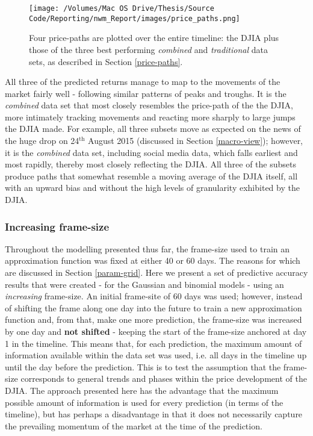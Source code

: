 \documentclass{article}
\begin{document}
\begin{figure}[htb]
\centering
\texttt{[image: /Volumes/Mac OS Drive/Thesis/Source Code/Reporting/nwm\_Report/images/price\_paths.png]}
\caption[Four price-paths, comparing forecasted returns against actual returns]{\label{fig:price-paths}Four price-paths are plotted over the entire timeline: the DJIA plus those of the three best performing \emph{combined} and \emph{traditional} data sets, as described in Section \ref{price-paths}.}
\end{figure}

All three of the predicted returns manage to map to the movements of the market fairly well - following similar patterns of peaks and troughs. It is the \emph{combined} data set that most closely resembles the price-path of the the DJIA, more intimately tracking movements and reacting more sharply to large jumps the DJIA made. For example, all three subsets move as expected on the news of the huge drop on 24$^{\text{th}}$ August 2015 (discussed in Section \ref{macro-view}); however, it is the \emph{combined} data set, including social media data, which falls earliest and most rapidly, thereby most closely reflecting the DJIA. All three of the subsets produce paths that somewhat resemble a moving average of the DJIA itself, all with an upward bias and without the high levels of granularity exhibited by the DJIA.


\subsubsection{Increasing frame-size}
\label{sec-6-4-6}

Throughout the modelling presented thus far, the frame-size used to train an approximation function was fixed at either 40 or 60 days. The reasons for which are discussed in Section \ref{param-grid}. Here we present a set of predictive accuracy results that were created - for the Gaussian and binomial models - using an \emph{increasing} frame-size. An initial frame-site of 60 days was used; however, instead of shifting the frame along one day into the future to train a new approximation function and, from that, make one more prediction, the frame-size was increased by one day and \textbf{not shifted} - keeping the start of the frame-size anchored at day 1 in the timeline. This means that, for each prediction, the maximum amount of information available within the data set was used, i.e. all days in the timeline up until the day before the prediction. This is to test the assumption that the frame-size corresponds to general trends and phases within the price development of the DJIA. The approach presented here has the advantage that the maximum possible amount of information is used for every prediction (in terms of the timeline), but has perhaps a disadvantage in that it does not necessarily capture the prevailing momentum of the market at the time of the prediction.
\end{document}
